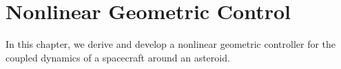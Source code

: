 
\chapter{Nonlinear Geometric Control}\label{sec:se3_control}

In this chapter, we derive and develop a nonlinear geometric controller for the coupled dynamics of a spacecraft around an asteroid.

